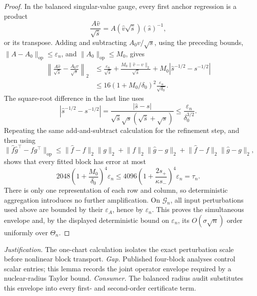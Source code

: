 \documentclass{article}
\begin{document}
\begin{proof}
In the balanced singular-value gauge, every first anchor regression is a product
\[
\frac{A\widehat v}{\sqrt{\widehat s}}
=A(\widehat v\sqrt{\widehat s})(\widehat s)^{-1},
\]
or its transpose.  Adding and subtracting \(A_0v/\sqrt s\), using the preceding bounds,
\(\lVert A-A_0\rVert_{\mathrm{op}}\le\varepsilon_n\), and
\(\lVert A_0\rVert_{\mathrm{op}}\le M_0\), gives
\[
\begin{aligned}
\left\lVert\frac{A\widehat v}{\sqrt{\widehat s}}
-\frac{A_0v}{\sqrt s}\right\rVert_2
&\le
\frac{\varepsilon_n}{\sqrt{\widehat s}}
+\frac{M_0\lVert\widehat v-v\rVert_2}{\sqrt{\widehat s}}
+M_0\left|\widehat s^{-1/2}-s^{-1/2}\right|\\
&\le16(1+M_0/\delta_0)^2
\frac{\varepsilon_n}{\sqrt{\delta_0}}.
\end{aligned}
\]
The square-root difference in the last line uses
\[
|\widehat s^{-1/2}-s^{-1/2}|
=\frac{|\widehat s-s|}
{\sqrt{\widehat s}\sqrt s(\sqrt{\widehat s}+\sqrt s)}
\le\frac{\varepsilon_n}{\delta_0^{3/2}}.
\]
Repeating the same add-and-subtract calculation for the refinement step, and then using
\[
\lVert\widehat f\widehat g^{\top}-fg^{\top}\rVert_{\mathrm{op}}
\le\lVert\widehat f-f\rVert_2\lVert g\rVert_2
+\lVert f\rVert_2\lVert\widehat g-g\rVert_2
+\lVert\widehat f-f\rVert_2\lVert\widehat g-g\rVert_2,
\]
shows that every fitted block has error at most
\[
2048\left(1+\frac{M_0}{\delta_0}\right)^4\varepsilon_n
\le4096\left(1+\frac{2s_+}{\kappa s_-}\right)^4\varepsilon_n
=\tau_n.
\]
There is only one representation of each row and column, so deterministic aggregation introduces no further amplification.  On \(\mathcal G_n\), all input perturbations used above are bounded by their \(\varepsilon_A\), hence by \(\varepsilon_n\).  This proves the simultaneous envelope and, by the displayed deterministic bound on \(\varepsilon_n\), its \(O(\sigma\sqrt n)\) order uniformly over \(\Theta_n\).
\end{proof}
\par\smallskip\noindent \textit{Justification.} The one-chart calculation isolates the exact perturbation scale before nonlinear block transport. \textit{Gap.} Published four-block analyses control scalar entries; this lemma records the joint operator envelope required by a nuclear-radius Taylor bound. \textit{Consumer.} The balanced radius audit substitutes this envelope into every first- and second-order certificate term.
\end{document}
